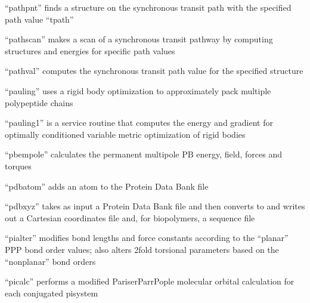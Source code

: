 \documentclass[letterpaper,11pt,english]{sphinxmanual}
\begin{document}


“pathpnt” finds a structure on the synchronous transit path
with the specified path value “tpath”


“pathscan” makes a scan of a synchronous transit pathway by
computing structures and energies for specific path values


“pathval” computes the synchronous transit path value for
the specified structure


“pauling” uses a rigid body optimization to approximately
pack multiple polypeptide chains


“pauling1” is a service routine that computes the energy
and gradient for optimally conditioned variable metric
optimization of rigid bodies



“pbempole” calculates the permanent multipole PB energy,
field, forces and torques



“pdbatom” adds an atom to the Protein Data Bank file


“pdbxyz” takes as input a Protein Data Bank file and then
converts to and writes out a Cartesian coordinates file and,
for biopolymers, a sequence file


“pialter” modifies bond lengths and force constants according
to the “planar” P\sphinxhyphen{}P\sphinxhyphen{}P bond order values; also alters 2\sphinxhyphen{}fold
torsional parameters based on the “nonplanar” bond orders


“picalc” performs a modified Pariser\sphinxhyphen{}Parr\sphinxhyphen{}Pople molecular
orbital calculation for each conjugated pisystem
\end{document}
